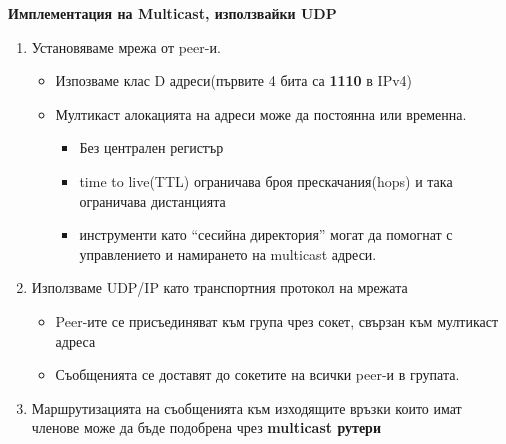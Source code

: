 \documentclass[11pt]{article} %
\newcommand{\enumNum}{\renewcommand{\theenumi}{\arabic{enumi}}}
\begin{document}
\textbf{Имплементация на Multicast, използвайки UDP}\\
\enumNum
\begin{enumerate}[noitemsep]
	\item Установяваме мрежа от peer-и.
	\begin{itemize}[noitemsep]
		\item Изпозваме клас D адреси(първите 4 бита са \textbf{1110} в IPv4)
		\item Мултикаст алокацията на адреси може да постоянна или временна.
		\begin{itemize}[noitemsep]
			\item Без централен регистър
			\item time to live(TTL) ограничава броя прескачания(hops) и така ограничава дистанцията
			\item инструменти като \enquote{сесийна директория} могат да помогнат с управлението и намирането на multicast адреси. 
		\end{itemize}
	\end{itemize}
	\item Използваме UDP/IP като транспортния протокол на мрежата
	\begin{itemize}[noitemsep]
		\item Peer-ите се присъединяват към група чрез сокет, свързан към мултикаст адреса
		\item Съобщенията се доставят до сокетите на всички peer-и в групата.
	\end{itemize}
	\item Маршрутизацията на съобщенията към изходящите връзки които имат членове може да бъде подобрена чрез \textbf{multicast рутери}\\\par    
\end{enumerate}
\end{document}
